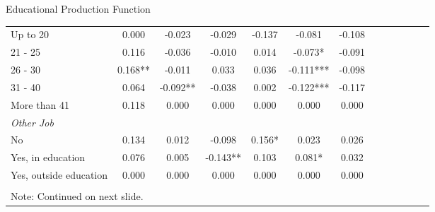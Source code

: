\documentclass{beamer}
\begin{document}
\begin{frame}{Educational Production Function}
\begin{table}
\begin{adjustbox}{max width=\textwidth}
\begin{tabular}{l*{6}{cc}}
Up to 20            &       0.000   &      -0.023   &      -0.029   &      -0.137   &      -0.081   &      -0.108   \\
21 - 25             &       0.116   &      -0.036   &      -0.010   &       0.014   &      -0.073*  &      -0.091   \\
26 - 30             &       0.168** &      -0.011   &       0.033   &       0.036   &      -0.111***&      -0.098   \\
31 - 40             &       0.064   &      -0.092** &      -0.038   &       0.002   &      -0.122***&      -0.117   \\
More than 41        &       0.118   &       0.000   &       0.000   &       0.000   &       0.000   &       0.000   \\
\emph{Other Job}    &               &               &               &               &               &               \\
No                  &       0.134   &       0.012   &      -0.098   &       0.156*  &       0.023   &       0.026   \\
Yes, in education&       0.076   &       0.005   &      -0.143** &       0.103   &       0.081*  &       0.032   \\
Yes, outside education&       0.000   &       0.000   &       0.000   &       0.000   &       0.000   &       0.000   \vspace{-3pt}\\
\bottomrule
\vspace{-18pt} \\
\multicolumn{7}{l}{\tiny Note: Continued on next slide.}\\
\end{tabular}
\end{adjustbox}
\end{table}
\end{frame}
\end{document}
